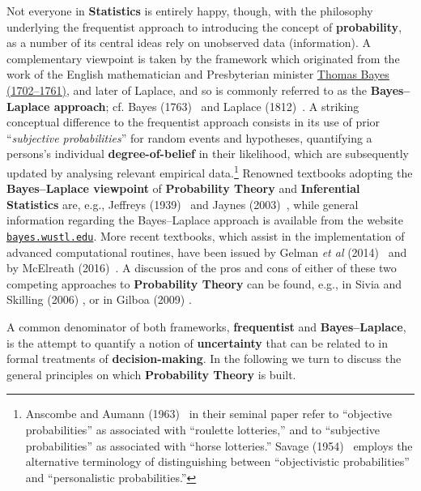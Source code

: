 \medskip
\noindent
Not everyone in \textbf{Statistics} is entirely happy, though, with 
the philosophy underlying the frequentist approach to introducing 
the concept of \textbf{probability}, as a number of its central
ideas rely on unobserved data (information). A complementary
viewpoint is taken by the framework which originated from the work
of the English mathematician and Presbyterian minister
\href{http://www-history.mcs.st-and.ac.uk/Biographies/Bayes.html}{Thomas Bayes (1702--1761)}, and later of Laplace, and so is 
commonly referred to as the \textbf{Bayes--Laplace approach}; cf. 
Bayes (1763)~ and Laplace (1812)~. A 
striking conceptual difference to the frequentist approach 
consists in its use of prior ``\textit{subjective probabilities}'' 
for random events and hypotheses, quantifying a persons's
individual \textbf{degree-of-belief} in their likelihood, which are subsequently updated by analysing relevant empirical
data.\footnote{Anscombe and Aumann (1963)~ in their
seminal paper refer to ``objective probabilities'' as associated
with ``roulette lotteries,'' and to ``subjective probabilities'' as
associated with ``horse lotteries.'' Savage (1954)~
employs the alternative terminology of distinguishing between
``objectivistic probabilities'' and ``personalistic
probabilities.''}
Renowned textbooks adopting the \textbf{Bayes--Laplace viewpoint}
of \textbf{Probability Theory} and \textbf{Inferential Statistics}
are, e.g., Jeffreys (1939)~ and Jaynes 
(2003)~, while general information regarding the 
Bayes--Laplace approach is available from the website 
\href{http://bayes.wustl.edu/}{\texttt{bayes.wustl.edu}}. More
recent textbooks, which assist in the implementation of advanced
computational routines, have been issued by Gelman
\textit{et al} (2014)~ and by McElreath
(2016)~. A discussion of the pros and cons of either of
these two competing approaches to \textbf{Probability Theory} can
be found, e.g., in Sivia and Skilling (2006)
, or in Gilboa (2009) .

\medskip
\noindent
A common denominator of both frameworks, \textbf{frequentist} and 
\textbf{Bayes--Laplace}, is the attempt to quantify a notion of 
\textbf{uncertainty} that can be related to in formal treatments of 
\textbf{decision-making}. In the following we turn to discuss the 
general principles on which \textbf{Probability Theory} is built.

